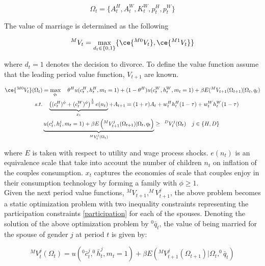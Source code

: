 \begin{equation*}
\Omega_t = \{ A_t^H, A_t^W, K_t^W, p_t^H, p_t^W  \} 
\end{equation*}

The value of marriage is determined as the following 

\begin{equation*}
^{M}V_t = \max_{d_t \in \{0,1\}} \{ \ce{^{M0}V_t}, \ce{^{M1}V_t} \}
\end{equation*}

where $d_t = 1$ denotes the decision to divorce. To define the value function assume that the leading period value function, $V_{t+1}$ are known. 

\begin{align}
\ce{^{M0}V_t}(\Omega_t)  &= \max_{q_t} \quad  \theta^H u(c_t^H, h_t^H, m_t =1) + (1 - \theta^H) u(c_t^W, h_t^W, m_t = 1) + \beta E(^MV_{t+1} (\Omega_{t+1})| \Omega_t, q_t) \nonumber \\
s.t. & \quad  \underbrace{\left ((c_t^H )^\phi + (c_t^W )^\phi  \right )^{\frac{1}{\phi}} e(n_t)}_{x_t} + A_{t+1} = (1+r) A_t + w_t^H h_t^H (1- \tau) + w_t^W h_t^W (1 - \tau) \nonumber \\
& \underbrace{u(c_t^j, h_t^j, m_t = 1) + \beta E \left (^MV^j_{t+1}(\Omega_{t+1}) | \Omega_t, q_t \right )}_{^{M}V_t^j (\Omega_t)}  \geq \enskip  ^{D}V_{t}^j (\Omega_t)\quad j \in \{ H, D\} \label{participation}
\end{align}


where $E$ is taken with respect to utility and wage process shocks.  $e(n_t)$ is an equivalence scale that take into account the number of children $n_t$ on inflation of the couples consumption. $x_t$ captures the economies of scale that couples enjoy in their consumption technology by forming a family with $\phi \geq 1$.  \\

Given the next period value functions, $^MV_{t+1}, ^MV^j_{t+1}$, the above problem becomes a static optimization problem with two inequality constraints representing the participation constraints \eqref{participation} for each of the spouses. Denoting the solution of the above optimization problem by $^0 \bar q_t$, the value of being married for the spouse of gender $j$ at period $t$ is given by:

\begin{equation*}
^{M}V_t^j (\Omega_t) = u(^0 \bar c_t^j, ^0 \bar h_t^j, m_t = 1) + \beta E \left (^MV^j_{t+1}(\Omega_{t+1}) | \Omega_t, ^{0} \bar q_t \right ) 
\end{equation*}

